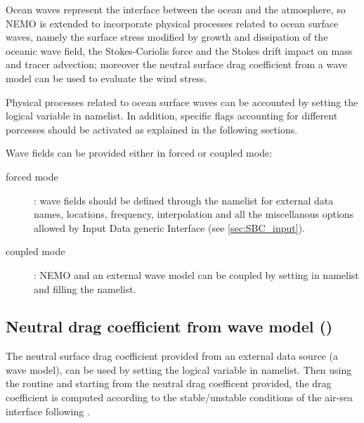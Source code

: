 \documentclass[../main/NEMO_manual]{subfiles}
\begin{document}
Ocean waves represent the interface between the ocean and the atmosphere, so NEMO is extended to incorporate 
physical processes related to ocean surface waves, namely the surface stress modified by growth and 
dissipation of the oceanic wave field, the Stokes-Coriolis force and the Stokes drift impact on mass and 
tracer advection; moreover the neutral surface drag coefficient from a wave model can be used to evaluate 
the wind stress.

Physical processes related to ocean surface waves can be accounted by setting the logical variable 
 in  namelist. In addition, specific flags accounting for 
different porcesses should be activated as explained in the following sections.

Wave fields can be provided either in forced or coupled mode:
\begin{description}
\item[forced mode]: wave fields should be defined through the  namelist 
for external data names, locations, frequency, interpolation and all the miscellanous options allowed by 
Input Data generic Interface (see \autoref{sec:SBC_input}). 
\item[coupled mode]: NEMO and an external wave model can be coupled by setting   
in  namelist and filling the  namelist.
\end{description}


\subsection{Neutral drag coefficient from wave model (\protect{})}
\label{subsec:SBC_wave_cdgw}

The neutral surface drag coefficient provided from an external data source (\ie a wave model), 
can be used by setting the logical variable   in  namelist. 
Then using the routine  and starting from the neutral drag coefficent provided, 
the drag coefficient is computed according to the stable/unstable conditions of the 
air-sea interface following \citet{Large_Yeager_Rep04}. 


\end{document}
